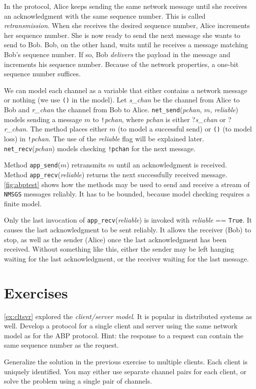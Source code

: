 \documentclass{report}
\begin{document}
In the protocol, Alice keeps sending the same network message until she
receives an acknowledgment with the same sequence number.
This is called \emph{retransmission}.
%
When she receives the desired sequence number, Alice increments her sequence number.
She is now ready to send the next message she wants to send to Bob.
Bob, on the other hand, waits until he receives a message matching
Bob's sequence number.  If so, Bob \emph{delivers} the payload in the
message and increments his sequence number.
Because of the network properties,  a one-bit sequence number suffices.

We can model each
channel as a variable that either contains a network message or nothing
(we use \texttt{()} in the model).  Let \textit{s\_chan} be the channel
from Alice to Bob and \textit{r\_chan} the channel from Bob to Alice.
\texttt{net\_send}(\textit{pchan}, $m$, \textit{reliable}) models sending
a message $m$ to
\texttt{!}\textit{pchan}, where \textit{pchan} is either ?\textit{s\_chan}
or ?\textit{r\_chan}.
The method places either $m$ (to model a successful send)
or \texttt{()} (to model loss) in \texttt{!}\textit{pchan}.
The use of the \textit{reliable} flag will be explained later.
\texttt{net\_recv}(\textit{pchan}) models checking \texttt{!pchan} for
the next message.

Method \texttt{app\_send}($m$) retransmits $m$ until
an acknowledgment is received.
Method \texttt{app\_recv}(\textit{reliable}) returns the next successfully received
message.
\autoref{fig:abptest} shows how the methods may be used to send and receive
a stream of \texttt{NMSGS} messages reliably.
It has to be bounded, because model checking requires a finite model.

Only the last invocation of \texttt{app\_recv}(\textit{reliable}) is invoked with
\textit{reliable} == \texttt{True}.  It causes the last acknowledgment to be sent
reliably.  It allows the receiver (Bob) to stop, as well as the sender (Alice)
once the last acknowledgment has been received.
Without something like this, either the sender may be left hanging waiting
for the last acknowledgment, or the receiver waiting for the last message.

\section*{Exercises}
\begin{problems}
\item \autoref{ex:cltsvr} explored the \emph{client/server model}.  It is popular
in distributed systems as well.
Develop a protocol for a single client and server using the same network
model as for the ABP protocol.
Hint: the response to a request can contain the same sequence number as the
request.
\item Generalize the solution in the previous exercise to multiple clients.
Each client is uniquely identified.  You may either use separate channel pairs
for each client, or solve the problem using a single pair of channels.
\end{problems}
\end{document}
